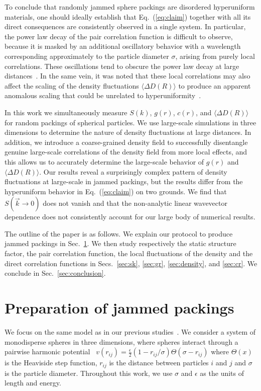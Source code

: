 \documentclass[aps,pre,twocolumn,superscriptaddress]{revtex4-1}
\begin{document}
To conclude that randomly jammed sphere packings 
are disordered hyperuniform materials, one should ideally establish that 
Eq.~(\ref{eq:claim}) together with all its direct consequences 
are consistently observed in a single system.  
In particular, the power law decay of the pair correlation
function is difficult to observe, because it is masked by 
an additional oscillatory 
behavior with a wavelength corresponding approximately to 
the particle diameter $\sigma$, 
arising from purely local correlations. These oscillations tend to obscure the 
power law decay at large distances~\cite{donev2005}. 
In the same vein, it was  
noted that these local correlations may also affect the scaling 
of the density fluctuations $\langle \Delta D(R) \rangle$
to produce an apparent anomalous scaling that could be unrelated to 
hyperuniformity~\cite{wu2015}.

In this work we simultaneously measure $S(k)$, $g(r)$,
$c(r)$, and $\langle \Delta D(R) \rangle$
for random packings of spherical particles. We use 
large-scale simulations in three dimensions to 
determine the nature of density fluctuations at large distances.
In addition, we introduce 
a coarse-grained density field to successfully 
disentangle genuine large-scale correlations of the density 
field from more local effects, and this allows us to 
accurately determine the large-scale behavior of $g(r)$
and $\langle \Delta D(R) \rangle$. Our results reveal 
a surprisingly complex pattern of density fluctuations at large-scale 
in jammed packings, but the results differ 
from the hyperuniform behavior in Eq.~(\ref{eq:claim})
on two grounds. We find that $S( \vec{k} \to 0)$ does not vanish and 
that the non-analytic linear wavevector dependence does 
not consistently account 
for our large body of numerical results. 

The outline of the paper is as follows. We explain our protocol
to produce jammed packings in Sec.~\ref{sec:preparation}. 
We then study respectively the static structure factor, 
the pair correlation function, the local fluctuations of the 
density and the direct correlation functions 
in Secs.~\ref{sec:sk}, \ref{sec:gr}, \ref{sec:density}, 
and \ref{sec:cr}.
We conclude in Sec.~\ref{sec:conclusion}.

\section{Preparation of jammed packings}
\label{sec:preparation}

We focus on the same model as in our previous 
studies~\cite{ikeda2015,ikeda2013}.  
We consider a system of monodisperse spheres in three dimensions, 
where spheres interact through a pairwise harmonic potential~\cite{durian1995} 
$v(r_{ij}) = \frac{\epsilon}{2} (1-r_{ij}/\sigma) \Theta(\sigma - r_{ij})$ 
where $\Theta (x)$ is the Heaviside step function, $r_{ij}$ is 
the distance between particles $i$ and $j$ 
and $\sigma$ is the particle diameter.
Throughout this work, we use $\sigma$ and $\epsilon$ as the 
units of length and energy. 
\end{document}

